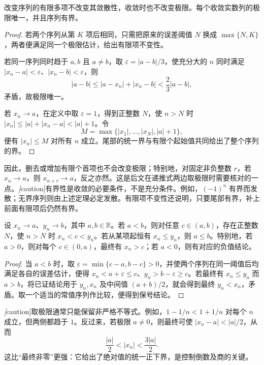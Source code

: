 \documentclass[UTF8,12pt,a4paper,fontset=fandol]{ctexbook}
\begin{document}
\begin{theorem}
\label{thm:basic-properties-of-sequence-limits}
改变序列的有限多项不改变其敛散性，收敛时也不改变极限。每个收敛实数列的极限唯一，并且序列有界。
\end{theorem}

\begin{proof}
若两个序列从第 $K$ 项后相同，只需把原来的误差阈值 $N$ 换成 $\max\{N,K\}$，两者便满足同一个极限估计，给出有限项不变性。

若同一序列同时趋于 $a,b$ 且 $a\neq b$，取 $\varepsilon=|a-b|/3$，使充分大的 $n$ 同时满足 $|x_n-a|<\varepsilon$、$|x_n-b|<\varepsilon$，则
\[
    |a-b|\leq|a-x_n|+|x_n-b|<\frac23|a-b|,
\]
矛盾，故极限唯一。

若 $x_n\to a$，在定义中取 $\varepsilon=1$，得到正整数 $N$，使 $n>N$ 时 $|x_n|\leq|a|+|x_n-a|<|a|+1$。令
\[
    M=\max\{|x_1|,\ldots,|x_N|,|a|+1\},
\]
便有 $|x_n|\leq M$ 对所有 $n$ 成立。尾部的统一界与有限个起始值共同给出了整个序列的界。
\end{proof}

因此，删去或增加有限个首项也不会改变极限；特别地，对固定非负整数 $r$，若 $x_n\to a$，则 $x_{n+r}\to a$，反之亦然。这是后文在递推式两边取极限时需要核对的一点。\emph[caution]{有界性是收敛的必要条件，不是充分条件。}例如，$(-1)^n$ 有界而发散；无界序列则由上述定理必定发散。有限项不变性还说明，只要尾部有界，补上前面有限项后仍然有界。

\begin{theorem}[保序性与最终保号性]
\label{thm:sequence-limit-order-properties}
设 $x_n\to a$、$y_n\to b$，其中 $a,b\in\mathbb{R}$。若 $a<b$，则对任意 $c\in(a,b)$，存在正整数 $N$，使 $n>N$ 时 $x_n<c<y_n$。若从某项起恒有 $x_n\leq y_n$，则 $a\leq b$。特别地，若 $a>0$，则对每个 $c\in(0,a)$，最终有 $x_n>c$；若 $a<0$，则有对应的负值结论。
\end{theorem}

\begin{proof}
当 $a<b$ 时，取 $\varepsilon=\min\{c-a,b-c\}>0$，并使两个序列在同一阈值后均满足各自的误差估计，便得 $x_n<a+\varepsilon\leq c$、$y_n>b-\varepsilon\geq c$。若最终有 $x_n\leq y_n$ 而 $a>b$，将已证结论用于 $y_n,x_n$ 及中间值 $(a+b)/2$，就会得到最终 $y_n<x_n$，矛盾。取一个适当的常值序列作比较，便得到保号结论。
\end{proof}

\emph[caution]{取极限通常只能保留非严格不等式。}例如，$1-1/n<1+1/n$ 对每个 $n$ 成立，但两侧都趋于 $1$。反过来，若极限 $a\neq0$，则最终可使 $|x_n-a|<|a|/2$，从而
\begin{equation}
    \frac{|a|}{2}<|x_n|<\frac{3|a|}{2}.
    \label{eq:nonzero-sequence-limit-away-from-zero}
\end{equation}
这比“最终非零”更强：它给出了绝对值的统一正下界，是控制倒数及商的关键。
\end{document}
